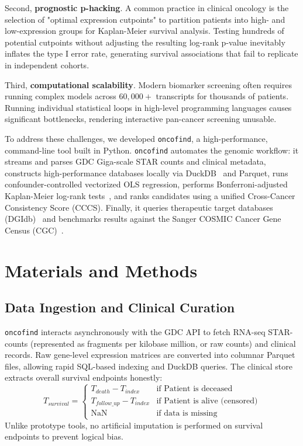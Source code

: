 \documentclass[11pt,a4paper]{article}
\begin{document}
Second, \textbf{prognostic p-hacking}. A common practice in clinical oncology is the selection of "optimal expression cutpoints" to partition patients into high- and low-expression groups for Kaplan-Meier survival analysis. Testing hundreds of potential cutpoints without adjusting the resulting log-rank p-value inevitably inflates the type I error rate, generating survival associations that fail to replicate in independent cohorts.

Third, \textbf{computational scalability}. Modern biomarker screening often requires running complex models across $60,000+$ transcripts for thousands of patients. Running individual statistical loops in high-level programming languages causes significant bottlenecks, rendering interactive pan-cancer screening unusable.

To address these challenges, we developed \texttt{oncofind}, a high-performance, command-line tool built in Python. \texttt{oncofind} automates the genomic workflow: it streams and parses GDC Giga-scale STAR counts and clinical metadata, constructs high-performance databases locally via DuckDB~\cite{duckdb2019} and Parquet, runs confounder-controlled vectorized OLS regression, performs Bonferroni-adjusted Kaplan-Meier log-rank tests~\cite{lifelines2020, kaplan1958}, and ranks candidates using a unified Cross-Cancer Consistency Score (CCCS). Finally, it queries therapeutic target databases (DGIdb)~\cite{dgidb2024} and benchmarks results against the Sanger COSMIC Cancer Gene Census (CGC)~\cite{cosmic2021}.

\section{Materials and Methods}

\subsection{Data Ingestion and Clinical Curation}
\texttt{oncofind} interacts asynchronously with the GDC API to fetch RNA-seq STAR-counts (represented as fragments per kilobase million, or raw counts) and clinical records. Raw gene-level expression matrices are converted into columnar Parquet files, allowing rapid SQL-based indexing and DuckDB queries. The clinical store extracts overall survival endpoints honestly:
\begin{equation}
T_{survival} = 
\begin{cases} 
T_{death} - T_{index} & \text{if Patient is deceased} \\
T_{follow\_up} - T_{index} & \text{if Patient is alive (censored)} \\
\text{NaN} & \text{if data is missing}
\end{cases}
\end{equation}
Unlike prototype tools, no artificial imputation is performed on survival endpoints to prevent logical bias.
\end{document}
